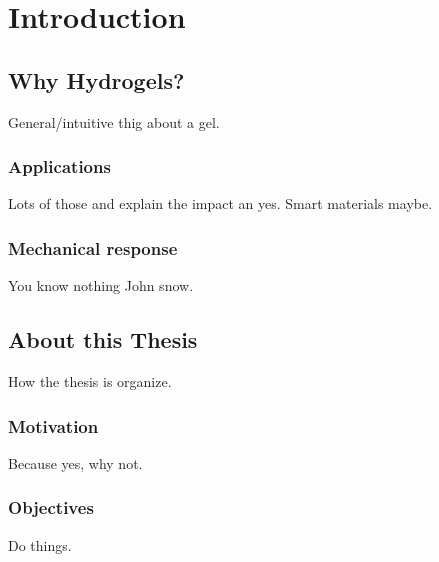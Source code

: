 \chapter{Introduction}\label{ch1:Intro}

\section{Why Hydrogels?}

General/intuitive thig about a gel.

\subsection{Applications}

Lots of those and explain the impact an yes.
Smart materials maybe.

\subsection{Mechanical response}

You know nothing John snow.

\section{About this Thesis}

How the thesis is organize.

\subsection{Motivation}

Because yes, why not.

\subsection{Objectives}

Do things.



